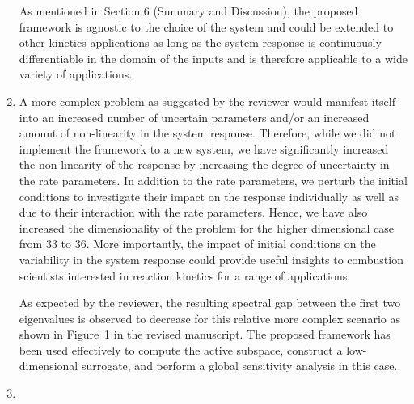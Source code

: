 \documentclass[11pt,final]{article}
\newcommand{\referee}[1]{\vspace{.1ex}\noindent{\textcolor{blue}{#1}}}
\begin{document}
\begin{enumerate}[wide, labelwidth=!, labelindent=0pt]
As mentioned in Section 6
(Summary and Discussion), the proposed framework is agnostic to the choice of the system and could be extended
to other kinetics applications as long as the system response is continuously differentiable in the domain of
the inputs and is therefore applicable to a wide variety of applications.    

\item \referee{Related to 1) above, it is of paramount importance that the authors consider, at least, 
methane, for which I expect less of a spectral gap in the matrix C. Ideally, more complex fuels with 
more nuanced responses.
In other words, if the method works well for a simple case, what is its value to the community?
The authors must try this out on a much more complex hydrocarbon/oxygen system.}

\noindent  A more complex problem as suggested by the reviewer would manifest itself into an increased number of
uncertain parameters and/or an increased amount of non-linearity in the system response. Therefore, while
we did not implement the framework to a new system, we have significantly increased the non-linearity of the
response by increasing the degree of uncertainty in the rate parameters. In addition to the rate parameters,
we perturb the initial conditions to investigate their impact on the response individually as well as due to
their interaction with the rate parameters. Hence, we have also increased the dimensionality of the problem
for the higher dimensional case from 33 to 36. More importantly, the impact of initial conditions on the
variability in the system response could provide useful insights to combustion scientists interested in 
reaction kinetics for a range of applications.

As expected by the reviewer, the resulting spectral gap between the first two eigenvalues is observed to
decrease for this relative more complex scenario as shown in Figure~1 in the revised manuscript. 
The proposed framework has been used effectively to compute the active subspace, construct a low-dimensional
surrogate, and perform a global sensitivity analysis in this case. 

\item \referee{The authors report ignition delay times of 0.1 s (?). See for example Fig. 7 and Tab. 2.
Are these seconds (s)? If this is the case, what kind of conditions (temperature/pressure/stoichiometry)
are the authors considering? They seem very unphysical if the yield an ignition delay time of O(0.1 s).
I could not find any clarification of the initial conditions for the ignition calculations.
This is again a symptom of the disconnect between the authors' aims (a novel method, potentially very useful to the combustion community) and the combustion community's aims (more understanding and tools that can be of help in combustion kinetics).}


\end{enumerate}
\end{document}
